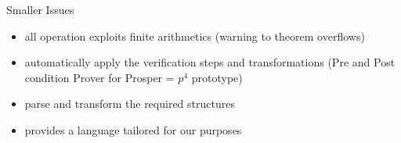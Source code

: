 \documentclass{beamer}
\begin{document}
\begin{frame}[fragile]{Smaller Issues}
\begin{itemize}
  \item all operation exploits finite arithmetics (warning to theorem overflows)
  \item automatically apply the verification steps and transformations 
    (Pre and Post condition Prover for Prosper = $p^4$ prototype)
  \item parse and transform the required structures
  \item provides a language tailored for our purposes
\end{itemize}
\end{frame}
\end{document}
